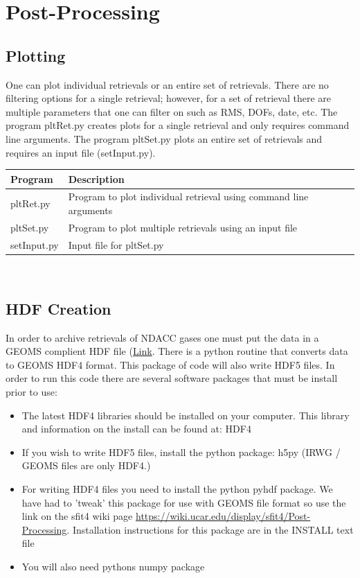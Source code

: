 \documentclass[12pt, letterpaper]{article}
\begin{document}
\section{Post-Processing}
\subsection{Plotting}
One can plot individual retrievals or an entire set of retrievals. There are no filtering options for a single retrieval; however, for a set of retrieval there are multiple parameters that one can filter on such as RMS, DOFs, date, etc. The program pltRet.py creates plots for a single retrieval and only requires command line arguments. The program pltSet.py plots an entire set of retrievals and requires an input file (setInput.py).\\

\begin{tabular}{ l l }
\textbf{Program} & \textbf{Description} \\
\hline
pltRet.py      & Program to plot individual retrieval using command line arguments\\
pltSet.py      & Program to plot multiple retrievals using an input file\\
setInput.py    & Input file for pltSet.py\\

\end{tabular} \\

\subsection{HDF Creation}
In order to archive retrievals of NDACC gases one must put the data in a GEOMS complient HDF file (\href{http://avdc.gsfc.nasa.gov/index.php?site=1989220925}{Link}. There is a python routine that converts data to GEOMS HDF4 format. This package of code will also write HDF5 files. In order to run this code there are several software packages that must be install prior to use:

\begin{itemize}
\item The latest HDF4 libraries should be installed on your computer. This library and information on the install can be found at: HDF4
\item If you wish to write HDF5 files, install the python package: h5py (IRWG / GEOMS files are only HDF4.)
\item For writing HDF4 files you need to install the python pyhdf package. We have had to 'tweak' this package for use with GEOMS file format so use the link on the sfit4 wiki page \href{https://wiki.ucar.edu/display/sfit4/Post-Processing}{https://wiki.ucar.edu/display/sfit4/Post-Processing}. Installation instructions for this package are in the INSTALL text file
\item You will also need pythons numpy package
\end{itemize}
\end{document}
